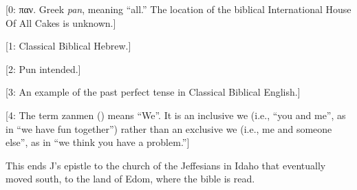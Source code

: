 \par\medskip\VerseRule\medskip

[0: παν. Greek \emph{pan}, meaning ``all.'' The location of the biblical International House Of All Cakes is unknown.]

[1: Classical Biblical Hebrew.]

[2: Pun intended.]

[3: An example of the past perfect tense in Classical Biblical English.]

[4: The term zanmen () means ``We''. It is an inclusive we (i.e., ``you and me'', as in ``we have fun together'') rather than an exclusive we (i.e., me and someone else'', as in ``we think you have a problem.'']

\par\medskip\VerseRule\medskip

This ends J's epistle to the church of the Jeffesians in Idaho that eventually moved south, to the land of Edom, where the bible is read.
